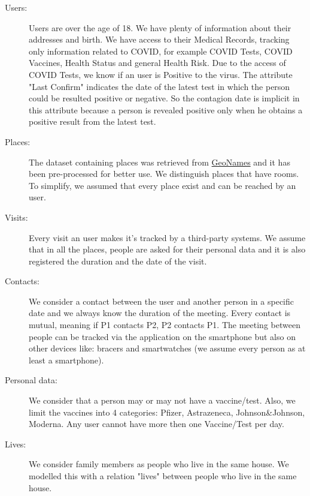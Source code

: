 \documentclass[table, 12pt]{article}
\begin{document}
\begin{description}
\item[Users:] Users are over the age of 18. We have plenty of information about their addresses and birth. We have access to their Medical Records, tracking only information related to COVID, for example COVID Tests, COVID Vaccines, Health Status and general Health Risk. Due to the access of COVID Tests, we know if an user is Positive to the virus. The attribute "Last Confirm" indicates the date of the latest test in which the person could be resulted positive or negative. So the contagion date is implicit in this attribute because a person is revealed positive only when he obtains a positive result from the latest test. 
\item[Places:]The dataset containing places was retrieved from \href{http://download.geonames.org/export/dump/}{GeoNames} and it has been pre-processed for better use. We distinguish places that have rooms. To simplify, we assumed that every place exist and can be reached by an user. 
\item[Visits:] Every visit an user makes it's tracked by a third-party systems. We assume that in all the places, people are asked for their personal data and it is also registered the duration and the date of the visit.
\item[Contacts:]We consider a contact between the user and another person in a specific date and we always know the duration of the meeting. Every contact is mutual, meaning if P1 contacts P2, P2 contacts P1. The meeting between people can be tracked via the application on the smartphone but also on other devices like: bracers and smartwatches (we assume every person as at least a smartphone). 
\item[Personal data:]
We consider that a person may or may not have a vaccine/test. Also, we limit the vaccines into 4 categories: Pfizer, Astrazeneca, Johnson\&Johnson, Moderna. Any user cannot have more then one Vaccine/Test per day.
\item[Lives:] We consider family members as people who live in the same house. We modelled this with a relation "lives" between people who live in the same house.
\end{description} 
\newpage
\end{document}
